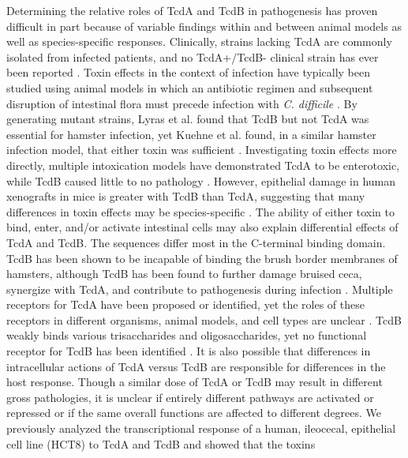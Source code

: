 Determining the relative roles of TcdA and TcdB in pathogenesis has 
proven difficult in part because of variable findings within and 
between animal models as well as species-specific responses. Clinically, 
strains lacking TcdA are commonly isolated from infected patients, and 
no TcdA+/TcdB- clinical strain has ever been reported \cite{Drudy:2007fa}. 
Toxin effects in the context of infection have typically been studied 
using animal models in which an antibiotic regimen and subsequent 
disruption of intestinal flora must precede infection with 
\textit{C. difficile} \cite{Small:1968ux,Bartlett:1977wra}. By generating 
mutant strains, Lyras et al. found that TcdB but not TcdA was 
essential for hamster infection, yet Kuehne et al. found, in a 
similar hamster infection model, that either toxin was sufficient 
\cite{Lyras:2009jx,Kuehne:2010hv}. Investigating toxin effects 
more directly, multiple intoxication models have demonstrated 
TcdA to be enterotoxic, while TcdB caused little to no pathology 
\cite{Libby:1982wm,Taylor:1981uda,Lyerly:1985dx}. However, epithelial 
damage in human xenografts in mice is greater with TcdB than TcdA, 
suggesting that many differences in toxin effects may be species-specific 
\cite{Savidge:2003ck}. The ability of either toxin to bind, enter, 
and/or activate intestinal cells may also explain differential 
effects of TcdA and TcdB. The sequences differ most in the C-terminal 
binding domain. TcdB has been shown to be incapable of binding the 
brush border membranes of hamsters, although TcdB has been found to 
further damage bruised ceca, synergize with TcdA, and contribute to 
pathogenesis during infection \cite{Lyras:2009jx,Lyerly:1985dx,Rolfe:1991vx}. 
Multiple receptors for TcdA have been proposed or identified, yet the 
roles of these receptors in different organisms, animal models, and 
cell types are unclear 
\cite{Krivan:1986tq,Tucker:1991uk,Rolfe:1995wl,Pothoulakis:1996ba,Pothoulakis:1996kd,Na:2008eu}. 
TcdB weakly binds various trisaccharides and oligosaccharides, yet 
no functional receptor for TcdB has been identified \cite{ElHawiet:2011ep}. 
It is also possible that differences in intracellular actions of TcdA 
versus TcdB are responsible for differences in the host response. Though 
a similar dose of TcdA or TcdB may result in different gross pathologies, 
it is unclear if entirely different pathways are activated or repressed 
or if the same overall functions are affected to different degrees. We 
previously analyzed the transcriptional response of a human, ileocecal, 
epithelial cell line (HCT8) to TcdA and TcdB and showed that the toxins 
